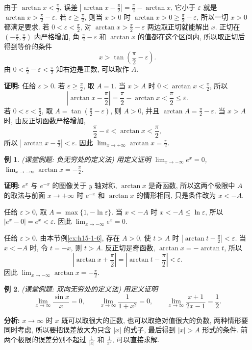 \documentclass[UTF8,openany]{ctexbook}
\theoremstyle{chinesetextbook}
\newtheorem{example}{例}[section]
\newenvironment{cnproof}{\par\indent\textbf{证明:} \ignorespaces}{\par}
\begin{document}
由于 $\displaystyle\arctan x<\frac\pi2$, 误差 $\displaystyle\left|\arctan x-\frac\pi2\right|=\frac\pi2-\arctan x$, 它小于 $\varepsilon$ 就是 $\displaystyle\arctan x>\frac\pi2-\varepsilon$. 若 $\displaystyle\varepsilon\ge\frac\pi2$, 则当 $x>0$ 时 $\displaystyle\arctan x>0\ge\frac\pi2-\varepsilon$, 所以一切 $x>0$ 都满足要求. 若 $\displaystyle0<\varepsilon<\frac\pi2$, 对 $\displaystyle\arctan x>\frac\pi2-\varepsilon$ 两边取正切就能解出 $x$. 正切在 $\displaystyle\left(-\frac\pi2,\frac\pi2\right)$ 内严格增加, 角 $\displaystyle\frac\pi2-\varepsilon$ 和 $\arctan x$ 的值都在这个区间内, 所以取正切后得到等价的条件
\[
x>\tan\left(\frac\pi2-\varepsilon\right).
\]
由 $\displaystyle0<\frac\pi2-\varepsilon<\frac\pi2$ 知右边是正数, 可以取作 $A$.
\begin{cnproof}
任给 $\varepsilon>0$. 若 $\displaystyle\varepsilon\ge\frac\pi2$, 取 $A=1$. 当 $x>A$ 时 $\displaystyle0<\arctan x<\frac\pi2$, 所以
\[
\left|\arctan x-\frac\pi2\right|=\frac\pi2-\arctan x<\frac\pi2\le\varepsilon.
\]
若 $\displaystyle0<\varepsilon<\frac\pi2$, 取 $\displaystyle A=\tan\left(\frac\pi2-\varepsilon\right)$, 则 $A>0$, 并且 $\displaystyle\arctan A=\frac\pi2-\varepsilon$. 当 $x>A$ 时, 由反正切函数严格增加,
\[
\frac\pi2-\varepsilon<\arctan x<\frac\pi2,
\]
所以 $\displaystyle\left|\arctan x-\frac\pi2\right|<\varepsilon$. 因此 $\displaystyle\lim_{x\to+\infty}\arctan x=\frac\pi2$.
\end{cnproof}
\begin{example}
\textnormal{(课堂例题: 负无穷处的定义法)} 用定义证明 $\displaystyle\lim_{x\to-\infty}e^x=0$, $\displaystyle\lim_{x\to-\infty}\arctan x=-\frac\pi2$.
\end{example}
\begin{cnproof}
$e^x$ 与 $e^{-x}$ 的图像关于 $y$ 轴对称, $\arctan x$ 是奇函数, 所以这两个极限中 $A$ 的取法与前面 $x\to+\infty$ 时 $e^{-x}$ 和 $\arctan x$ 的情形相同, 只是条件改为 $x<-A$.

任给 $\varepsilon>0$, 取 $A=\max\{1,-\ln\varepsilon\}$. 当 $x<-A$ 时 $x<-A\le\ln\varepsilon$, 所以 $|e^x-0|=e^x<\varepsilon$. 因此 $\displaystyle\lim_{x\to-\infty}e^x=0$.

任给 $\varepsilon>0$. 由本节例\ref{ex:h15-1-6}, 存在 $A>0$, 使 $t>A$ 时 $\displaystyle\left|\arctan t-\frac\pi2\right|<\varepsilon$. 当 $x<-A$ 时, 令 $t=-x$, 则 $t>A$. 反正切是奇函数, $\arctan x=-\arctan t$, 所以
\[
\left|\arctan x+\frac\pi2\right|=\left|\arctan t-\frac\pi2\right|<\varepsilon.
\]
因此 $\displaystyle\lim_{x\to-\infty}\arctan x=-\frac\pi2$.
\end{cnproof}
\begin{example}
\textnormal{(课堂例题: 双向无穷处的定义法)} 用定义证明
\[
\lim_{x\to\infty}\frac{\sin x}x=0,\qquad\lim_{x\to\infty}\frac1{1+x^2}=0,\qquad\lim_{x\to\infty}\frac{x+1}{2x-1}=\frac12.
\]
\end{example}
\par\indent\textbf{分析:} $x\to\infty$ 时 $x$ 既可以取很大的正数, 也可以取绝对值很大的负数, 两种情形要同时考虑, 所以要把误差放大为只含 $|x|$ 的式子, 最后得到 $|x|>A$ 形式的条件. 前两个极限的误差分别不超过 $\displaystyle\frac1{|x|}$ 和 $\displaystyle\frac1{x^2}$, 可以直接求解.
\end{document}
